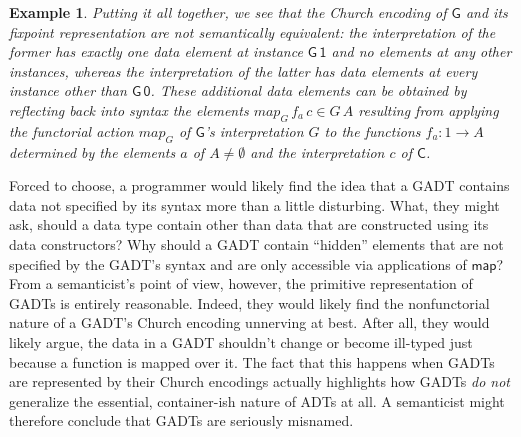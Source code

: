 \documentclass[submission,copyright,creativecommons]{eptcs}
\newtheorem{example}[thm]{Example}
\begin{document}
\begin{example}
Putting it all together, we see that the Church encoding of
$\mathsf{G}$ and its fixpoint representation are not semantically
equivalent: the interpretation of the former has exactly one data
element at instance $\mathsf{G\,1}$ and no elements at any other
instances, whereas the interpretation of the latter has data elements
at every instance other than $\mathsf{G\,0}$.
These additional data elements can be obtained by reflecting back into
syntax the elements $\mathit{map}_G\,f_a\,c \in G\,A$ resulting from
applying the functorial action $\mathit{map}_G$ of $\mathsf{G}$'s
interpretation $G$ to the functions $f_a : 1 \to A$ determined by the
elements $a$ of $A \not = \emptyset$ and the interpretation $c$ of
$\mathsf{C}$.
\end{example}

Forced to choose, a programmer would likely find the idea that a GADT
contains data not specified by its syntax more than a little
disturbing. What, they might ask, should a data type contain other
than data that are constructed using its data constructors? Why should
a GADT contain ``hidden'' elements that are not specified by the
GADT's syntax and are only accessible via applications of
$\mathsf{map}$? From a semanticist's point of view, however, the
primitive representation of GADTs is entirely reasonable. Indeed, they
would likely find the nonfunctorial nature of a GADT's Church encoding
unnerving at best. After all, they would likely argue, the data in a
GADT shouldn't change or become ill-typed just because a function is
mapped over it. The fact that this happens when GADTs are represented
by their Church encodings actually highlights how GADTs {\em do not}
generalize the essential, container-ish nature of ADTs at all. A
semanticist might therefore conclude that GADTs are seriously
misnamed.

\begin{comment}
The reader familiar with {\color{red} short cut fusion} will quickly
see that the non-uniform nature of GADTs that are not nested types
entails that short cut fusion cannot be validated for their Church
encodings. In fact, it is not even possible to define a
$\mathsf{build}$ function, which is a crucial ingredient in short cut
fusion, for the Church encoding of a GADT that is not a nested
type. But the fact that not all of the elements in the functorial
completion of a GADT that is not a nested type are directly
representable as applications of data constructors means that it is
also impossible to define a $\mathsf{build}$ function for the fixpoint
representation of such a GADT. Ultimately this is not surprising,
though: if short cut fusion were to hold for a GADT then its Church
encoding and {\color{red} fixpoint} primitive representation would
necessarily be semantically equivalent.
\end{comment}
\end{document}
